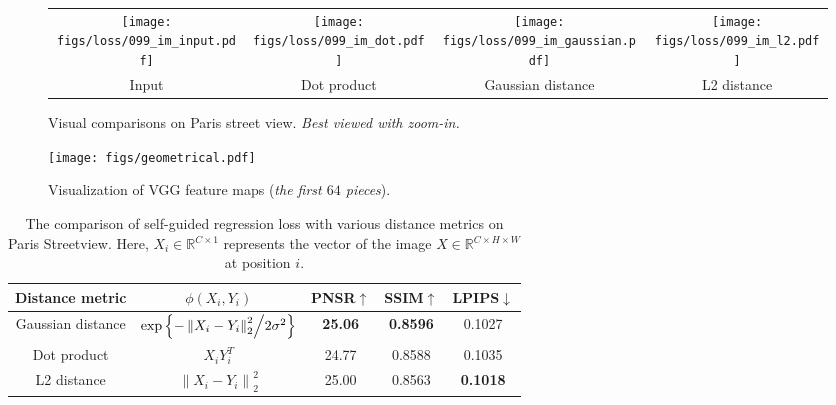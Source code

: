 \documentclass[journal]{IEEEtran}
\begin{document}
\begin{figure*}[ht]
	\centering
	\begin{tabular}{cccc}
		\texttt{[image: figs/loss/099\_im\_input.pdf]} &
		\hspace{-3mm}
		\texttt{[image: figs/loss/099\_im\_dot.pdf]} &
		\hspace{-3mm}
		\texttt{[image: figs/loss/099\_im\_gaussian.pdf]} &
		\hspace{-3mm}
		\texttt{[image: figs/loss/099\_im\_l2.pdf]} \\
		
		Input & Dot product & Gaussian distance & L2 distance \\
	\end{tabular}
	\caption{Visual comparisons on Paris street view. \textit{Best viewed with zoom-in.}}
	\label{fig:loss}
\end{figure*}


\begin{figure*}[htpb]
	\centering
	\texttt{[image: figs/geometrical.pdf]}
	\caption{Visualization of VGG feature maps (\textit{the first $64$ pieces}).}
	\label{fig:visualization}
\end{figure*}

\begin{table*}[htpb]
	\centering
	\caption{The comparison of self-guided regression loss with various distance metrics on Paris Streetview. Here, ${X_i} \in \mathbb{R}{^{C \times 1}}$ represents the vector of the image $X \in \mathbb{R}{^{C \times H \times W}}$ at position $i$.}
	\label{tab:distance-metrics}
	\begin{tabular}{|c|c|c|c|c|}
		\hline
		Distance metric & $\phi \left( {{X_i},{Y_i}} \right)$ & PNSR$ \uparrow $ & SSIM$ \uparrow $ & LPIPS$ \downarrow $ \\
		\hline
		Gaussian distance & $\exp \left\{ {{{ - \left\| {{X_i} - {Y_i}} \right\|_2^2} \mathord{\left/
					{\vphantom {{ - \left\| {{X_i} - {Y_i}} \right\|_2^2} {2{\sigma ^2}}}} \right.
					\kern-\nulldelimiterspace} {2{\sigma ^2}}}} \right\}$ & \textbf{25.06} & \textbf{0.8596} & 0.1027 \\
		\hline
		Dot product & ${X_i}Y_i^T$ & 24.77 & 0.8588 & 0.1035 \\
		\hline
		L2 distance & $\left\| {{X_i} - {Y_i}} \right\|_2^2$ & 25.00 & 0.8563 & \textbf{0.1018} \\
		\hline
	\end{tabular}
\end{table*}
\end{document}

